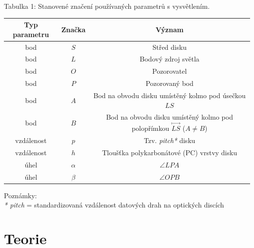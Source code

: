 \documentclass[titlepage]{article}
\begin{document}
\begin{center}
     \label{table:1}
    Tabulka 1: Stanovené značení používaných parametrů s vysvětlením. \\[3px]
    \begin{tabular}{c c c}
        Typ parametru & Značka   & Význam                                                                                       \\[1px]
        \hline
        bod           & $S$      & Střed disku                                                                                  \\
        bod           & $L$      & Bodový zdroj světla                                                                          \\
        bod           & $O$      & Pozorovatel                                                                                  \\
        bod           & $P$      & Pozorovaný bod                                                                               \\
        bod           & $A$      & Bod na obvodu disku umístěný kolmo pod úsečkou $LS$                                          \\
        bod           & $B$      & Bod na obvodu disku umístěný kolmo pod polopřímkou $\overset{\longmapsto}{LS} $ ($A \neq B$) \\
        vzdálenost    & $p$      & Tzv. \emph{pitch*} disku                                                                     \\
        vzdálenost    & $h$      & Tloušťka polykarbonátové (PC) vrstvy disku                                                   \\
        úhel          & $\alpha$ & $\angle LPA$                                                                                 \\
        úhel          & $\beta$  & $\angle OPB$                                                                                 \\
        \hline
    \end{tabular}
\end{center}
Poznámky: \\
\emph{* pitch} = standardizovaná vzdálenost datových drah na optických discích

\section{Teorie}
\end{document}
